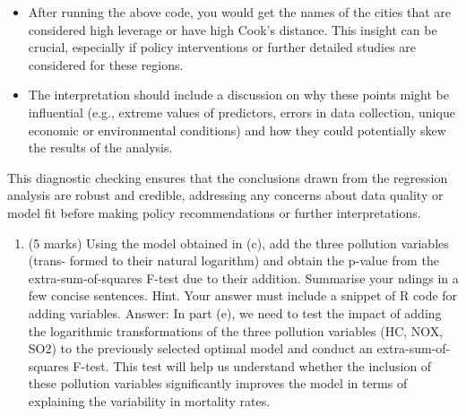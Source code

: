 \documentclass[
]{article}
\providecommand{\tightlist}{%
  \setlength{\itemsep}{0pt}\setlength{\parskip}{0pt}}
\begin{document}
\begin{itemize}
\tightlist
\item
  After running the above code, you would get the names of the cities
  that are considered high leverage or have high Cook's distance. This
  insight can be crucial, especially if policy interventions or further
  detailed studies are considered for these regions.
\item
  The interpretation should include a discussion on why these points
  might be influential (e.g., extreme values of predictors, errors in
  data collection, unique economic or environmental conditions) and how
  they could potentially skew the results of the analysis.
\end{itemize}

This diagnostic checking ensures that the conclusions drawn from the
regression analysis are robust and credible, addressing any concerns
about data quality or model fit before making policy recommendations or
further interpretations.

\begin{enumerate}
\def\labelenumi{(\alph{enumi})}
\setcounter{enumi}{4}
\tightlist
\item
  (5 marks) Using the model obtained in (c), add the three pollution
  variables (trans- formed to their natural logarithm) and obtain the
  p-value from the extra-sum-of-squares F-test due to their addition.
  Summarise your ndings in a few concise sentences. Hint. Your answer
  must include a snippet of R code for adding variables. Answer: In part
  (e), we need to test the impact of adding the logarithmic
  transformations of the three pollution variables (HC, NOX, SO2) to the
  previously selected optimal model and conduct an extra-sum-of-squares
  F-test. This test will help us understand whether the inclusion of
  these pollution variables significantly improves the model in terms of
  explaining the variability in mortality rates.
\end{enumerate}
\end{document}
